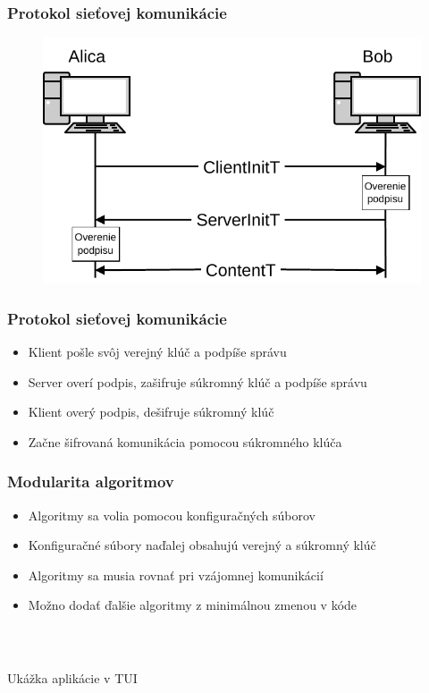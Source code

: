 \documentclass[%
  14pt,       				%
	t,                  %
	aspectratio=1610,   %
	unicode,						%
]{beamer}				    	%
\begin{document}
\begin{frame}[c]
	\frametitle{Protokol sieťovej komunikácie}
	\begin{figure}
		\includegraphics[width=.8\textwidth]{presentation_pictures/comm.pdf}
	\end{figure}
\end{frame}

\begin{frame}[c]
	\frametitle{Protokol sieťovej komunikácie}
	\large{\begin{itemize}
			\item Klient pošle svôj verejný klúč a podpíše správu
			\item Server overí podpis, zašifruje súkromný klúč a podpíše správu
			\item Klient overý podpis, dešifruje súkromný klúč
			\item Začne šifrovaná komunikácia pomocou súkromného klúča
		\end{itemize}
	}
\end{frame}

\begin{frame}[c]
	\frametitle{Modularita algoritmov}
	\large{\begin{itemize}
			\item Algoritmy sa volia pomocou konfiguračných súborov
			\item Konfiguračné súbory naďalej obsahujú verejný a súkromný klúč
			\item Algoritmy sa musia rovnať pri vzájomnej komunikácií
			\item Možno dodať ďalšie algoritmy z minimálnou zmenou v kóde
		\end{itemize}}
\end{frame}

\begin{frame}[c]
	\frametitle{\mbox{ }}
	\begin{center}
		{\Huge Ukážka aplikácie v TUI}
	\end{center}
\end{frame}
\end{document}

